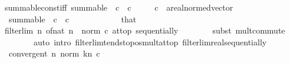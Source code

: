 \begin{isabellebody}
\isanewline
{}\isamarkupfalse%
\ summable{\isacharunderscore}{\kern0pt}const{\isacharunderscore}{\kern0pt}iff{\isacharcolon}{\kern0pt}\ {\isachardoublequoteopen}summable\ {\isacharparenleft}{\kern0pt}{\isasymlambda}{\isacharunderscore}{\kern0pt}{\isachardot}{\kern0pt}\ c{\isacharparenright}{\kern0pt}\ {\isasymlongleftrightarrow}\ c\ {\isacharequal}{\kern0pt}\ {}{\isachardoublequoteclose}\isanewline
\ \ \ c\ {\isacharcolon}{\kern0pt}{\isacharcolon}{\kern0pt}\ {\isachardoublequoteopen}{\isacharprime}{\kern0pt}a{\isacharcolon}{\kern0pt}{\isacharcolon}{\kern0pt}real{\isacharunderscore}{\kern0pt}normed{\isacharunderscore}{\kern0pt}vector{\isachardoublequoteclose}\isanewline
%
\isadelimproof
%
\endisadelimproof
%
\isatagproof
{}\isamarkupfalse%
\ {\isacharminus}{\kern0pt}\isanewline
\ \ \isamarkupfalse%
\ {\isachardoublequoteopen}{\isasymnot}\ summable\ {\isacharparenleft}{\kern0pt}{\isasymlambda}{\isacharunderscore}{\kern0pt}{\isachardot}{\kern0pt}\ c{\isacharparenright}{\kern0pt}{\isachardoublequoteclose}\ \ {\isachardoublequoteopen}c\ {\isasymnoteq}\ {}{\isachardoublequoteclose}\isanewline
\ \ \isamarkupfalse%
\ {\isacharminus}{\kern0pt}\isanewline
\ \ \ \ \isamarkupfalse%
\ that\ \isamarkupfalse%
\ {\isachardoublequoteopen}filterlim\ {\isacharparenleft}{\kern0pt}{\isasymlambda}n{\isachardot}{\kern0pt}\ of{\isacharunderscore}{\kern0pt}nat\ n\ {\isacharasterisk}{\kern0pt}\ norm\ c{\isacharparenright}{\kern0pt}\ at{\isacharunderscore}{\kern0pt}top\ sequentially{\isachardoublequoteclose}\isanewline
\ \ \ \ \ \ \isamarkupfalse%
\ {\isacharparenleft}{\kern0pt}subst\ mult{\isachardot}{\kern0pt}commute{\isacharparenright}{\kern0pt}\isanewline
\ \ \ \ \ \ \ \ {\isacharparenleft}{\kern0pt}auto\ intro{\isacharbang}{\kern0pt}{\isacharcolon}{\kern0pt}\ filterlim{\isacharunderscore}{\kern0pt}tendsto{\isacharunderscore}{\kern0pt}pos{\isacharunderscore}{\kern0pt}mult{\isacharunderscore}{\kern0pt}at{\isacharunderscore}{\kern0pt}top\ filterlim{\isacharunderscore}{\kern0pt}real{\isacharunderscore}{\kern0pt}sequentially{\isacharparenright}{\kern0pt}\isanewline
\ \ \ \ \isamarkupfalse%
\ \isamarkupfalse%
\ {\isachardoublequoteopen}{\isasymnot}\ convergent\ {\isacharparenleft}{\kern0pt}{\isasymlambda}n{\isachardot}{\kern0pt}\ norm\ {\isacharparenleft}{\kern0pt}{\isasymSum}k{\isacharless}{\kern0pt}n{\isachardot}{\kern0pt}\ c{\isacharparenright}{\kern0pt}{\isacharparenright}{\kern0pt}{\isachardoublequoteclose}\isanewline

\end{isabellebody}
